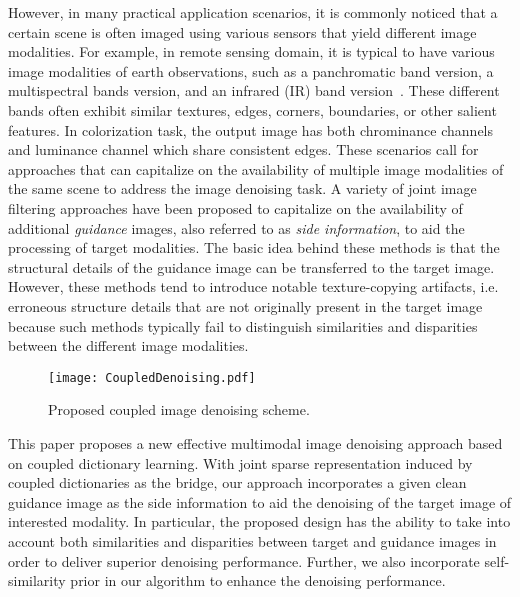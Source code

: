\documentclass{article}
\begin{document}
However, in many practical application scenarios, it is commonly noticed that a certain scene is often imaged using various sensors that yield different image modalities. For example, in remote sensing domain, it is typical to have various image modalities of earth observations, such as a panchromatic band version, a multispectral bands version, and an infrared (IR) band version~\cite{gomez2015multimodal,loncan2015hyperspectral}. These different bands often exhibit similar textures, edges, corners, boundaries, or other salient features. 
In colorization\cite{levin2004colorization} task, the output image has both chrominance channels and luminance channel which share consistent edges. These scenarios call for approaches that can capitalize on the availability of multiple image modalities of the same scene to address the image denoising task.
A variety of joint image filtering approaches have been proposed to capitalize on the availability of additional \emph{guidance} images, also referred to as \emph{side information}\cite{renna2016classification,mota2017compressed}, to aid the processing of target modalities\cite{kopf2007joint,he2013guided,ham2017robust,li2016deep,shen2015multispectral,zhang2014rolling}. 
The basic idea behind these methods is that the structural details of the guidance image can be transferred to the target image. However, these methods tend to introduce notable texture-copying artifacts, i.e. erroneous structure details that are not originally present in the target image because such methods typically fail to distinguish similarities and disparities between the different image modalities. 




\begin{figure}[t]
	\centering
	\texttt{[image: CoupledDenoising.pdf]}  
	\caption{Proposed coupled image denoising scheme.}
	\label{Fig:Diagram}
\end{figure}



This paper proposes a new effective multimodal image denoising approach based on coupled dictionary learning. With joint sparse representation induced by coupled dictionaries as the bridge, our approach incorporates a given clean guidance image as the side information to aid the denoising of the target image of interested modality. In particular, the proposed design has the ability to take into account both similarities and disparities between target and guidance images in order to deliver superior denoising performance. Further, we also incorporate self-similarity prior in our algorithm to enhance the denoising performance.
\end{document}
